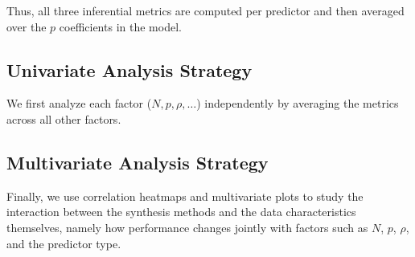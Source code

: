 Thus, all three inferential metrics are computed per predictor and then averaged over the $p$ coefficients in the model.

\subsection{Univariate Analysis Strategy}
We first analyze each factor ($N, p, \rho, \dots$) independently by averaging the metrics across all other factors.

\subsection{Multivariate Analysis Strategy}
Finally, we use correlation heatmaps and multivariate plots to study the interaction between the synthesis methods and the data characteristics themselves, namely how performance changes jointly with factors such as $N$, $p$, $\rho$, and the predictor type.
